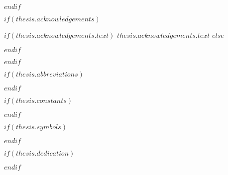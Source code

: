 $endif$

$if(thesis.acknowledgements)$

\begin{acknowledgements}
\addchaptertocentry{\acknowledgementname} %
$if(thesis.acknowledgements.text)$
$thesis.acknowledgements.text$
$else$

$endif$
\end{acknowledgements}

$endif$


\begingroup
\hypersetup{linkcolor=$if(toclinkcolor)$$toclinkcolor$$else$black$endif$}

\tableofcontents %

\listoffigures %

\listoftables %

\endgroup


$if(thesis.abbreviations)$



$endif$

$if(thesis.constants)$



$endif$

$if(thesis.symbols)$



$endif$

$if(thesis.dedication)$

\dedicatory{} 

$endif$


\mainmatter %

\pagestyle{thesis} %
